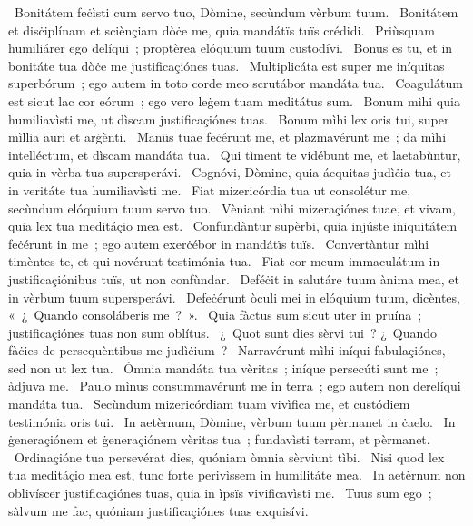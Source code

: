 {~Bonitátem feċìsti cum servo tuo, Dòmine, secùndum vèrbum tuum. 
~Bonitátem et disċiplínam et sciènçiam dòċe me, quia mandátïs tuïs crédidi. 
~Priùsquam humiliárer ego delíqui~; proptèrea elóquium tuum custodívi. 
~Bonus es tu, et in bonitáte tua dòċe me justificaçiónes tuas. 
~Multiplicáta est super me iníquitas superbórum~; ego autem in toto corde meo scrutábor mandáta tua. 
~Coagulátum est sicut lac cor eórum~; ego vero leġem tuam meditátus sum. 
~Bonum mìhi quia humiliavìsti me, ut dìscam justificaçiónes tuas. 
~Bonum mìhi lex oris tui, super mìllia auri et arġènti. 
~Manüs tuae feċérunt me, et plazmavérunt me~; da mìhi intelléctum, et dìscam mandáta tua. 
~Qui tìment te vidébunt me, et laetabùntur, quia in vèrba tua supersperávi. 
~Cognóvi, Dòmine, quia áequitas judìċia tua, et in veritáte tua humiliavìsti me. 
~Fiat mizericórdia tua ut consolétur me, secùndum elóquium tuum servo tuo. 
~Vèniant mìhi mizeraçiónes tuae, et vivam, quia lex tua meditáçio mea est. 
~Confundàntur supèrbi, quia injúste iniquitátem feċérunt in me~; ego autem exerċébor in mandátïs tuïs. 
~Convertàntur mìhi timèntes te, et qui novérunt testimónia tua. 
~Fiat cor meum immaculátum in justificaçiónibus tuïs, ut non confùndar. 
~Deféċit in salutáre tuum ànima mea, et in vèrbum tuum supersperávi. 
~Defeċérunt òculi mei in elóquium tuum, dicèntes, «~¿~Quando consoláberis me~?~». 
~Quia fàctus sum sicut uter in pruína~; justificaçiónes tuas non sum oblítus. 
~¿~Quot sunt dies sèrvi tui~? ¿~Quando fàċies de persequèntibus me judìċium~? 
~Narravérunt mìhi iníqui fabulaçiónes, sed non ut lex tua. 
~Òmnia mandáta tua vèritas~; iníque persecúti sunt me~; àdjuva me. 
~Paulo mìnus consummavérunt me in terra~; ego autem non derelíqui mandáta tua. 
~Secùndum mizericórdiam tuam vivìfica me, et custódiem testimónia oris tui. 
~In aetèrnum, Dòmine, vèrbum tuum pèrmanet in ċaelo. 
~In ġeneraçiónem et ġeneraçiónem vèritas tua~; fundavìsti terram, et pèrmanet. 
~Ordinaçióne tua persevérat dies, quóniam òmnia sèrviunt tìbi. 
~Nisi quod lex tua meditáçio mea est, tunc forte perivìssem in humilitáte mea. 
~In aetèrnum non oblivíscer justificaçiónes tuas, quia in ìpsïs vivificavìsti me. 
~Tuus sum ego~; sàlvum me fac, quóniam justificaçiónes tuas exquisívi. 
}
